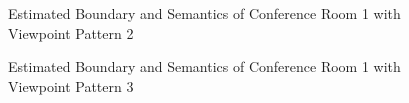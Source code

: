 \documentclass[11pt, a4paper,oneside,chapterprefix=false]{scrbook}
\begin{document}
\begin{figure}[H]
    \centering
      \label{fig:conf1 b 200 4} \hfill
     \label{fig:conf1 s 200 4}
    \caption{Estimated Boundary and Semantics of Conference Room 1 with Viewpoint Pattern 2}
    \label{fig:conf1 4}
\end{figure}

\begin{figure}[H]
    \centering
      \label{fig:conf1 b 200 5} \hfill
     \label{fig:conf1 s 200 5}
    \caption{Estimated Boundary and Semantics of Conference Room 1 with Viewpoint Pattern 3}
    \label{fig:conf1 5}
\end{figure}
\end{document}
